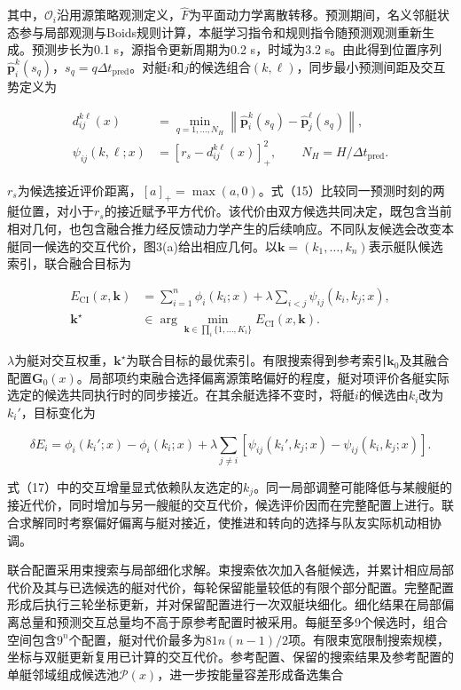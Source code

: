 \documentclass[UTF8,a4paper,zihao=5,fontset=none]{ctexart}
\begin{document}
其中，\(\mathcal O_i\)沿用源策略观测定义，\(\widehat F\)为平面动力学离散转移。预测期间，名义邻艇状态参与局部观测与Boids规则计算，本艇学习指令和规则指令随预测观测重新生成。预测步长为0.1 s，源指令更新周期为0.2 s，时域为3.2 s。由此得到位置序列\(\widehat{\boldsymbol p}_i^k(s_q)\)，\(s_q=q\Delta t_{\mathrm{pred}}\)。对艇\(i\)和\(j\)的候选组合\((k,\ell)\)，同步最小预测间距及交互势定义为

\[
\begin{aligned}
d_{ij}^{k\ell}(x)
&=\min_{q=1,\ldots,N_H}
\left\|\widehat{\boldsymbol p}_i^k(s_q)-\widehat{\boldsymbol p}_j^\ell(s_q)\right\|,\\
\psi_{ij}(k,\ell;x)&=\left[r_s-d_{ij}^{k\ell}(x)\right]_+^2,
\qquad N_H=H/\Delta t_{\mathrm{pred}}.
\end{aligned}
\tag{15}
\]

\(r_s\)为候选接近评价距离，\([a]_+=\max(a,0)\)。式（15）比较同一预测时刻的两艇位置，对小于\(r_s\)的接近赋予平方代价。该代价由双方候选共同决定，既包含当前相对几何，也包含融合推力经反馈动力学产生的后续响应。不同队友候选会改变本艇同一候选的交互代价，图3(a)给出相应几何。以\(\boldsymbol k=(k_1,\ldots,k_n)\)表示艇队候选索引，联合融合目标为

\[
\begin{aligned}
E_{\mathrm{CI}}(x,\boldsymbol k)
&=\sum_{i=1}^{n}\phi_i(k_i;x)
+\lambda\sum_{i<j}\psi_{ij}(k_i,k_j;x),\\
\boldsymbol k^\star&\in\arg\min_{\boldsymbol k\in\prod_i\{1,\ldots,K_i\}}
E_{\mathrm{CI}}(x,\boldsymbol k).
\end{aligned}
\tag{16}
\]

\(\lambda\)为艇对交互权重，\(\boldsymbol k^\star\)为联合目标的最优索引。有限搜索得到参考索引\(\boldsymbol k_0\)及其融合配置\(\boldsymbol G_0(x)\)。局部项约束融合选择偏离源策略偏好的程度，艇对项评价各艇实际选定的候选共同执行时的同步接近。在其余艇选择不变时，将艇\(i\)的候选由\(k_i\)改为\(k_i'\)，目标变化为

\[
\delta E_i=
\phi_i(k_i';x)-\phi_i(k_i;x)
+\lambda\sum_{j\ne i}
\left[\psi_{ij}(k_i',k_j;x)-\psi_{ij}(k_i,k_j;x)\right].
\tag{17}
\]

式（17）中的交互增量显式依赖队友选定的\(k_j\)。同一局部调整可能降低与某艘艇的接近代价，同时增加与另一艘艇的交互代价，候选评价因而在完整配置上进行。联合求解同时考察偏好偏离与艇对接近，使推进和转向的选择与队友实际机动相协调。

联合配置采用束搜索与局部细化求解。束搜索依次加入各艇候选，并累计相应局部代价及其与已选候选的艇对代价，每轮保留能量较低的有限个部分配置。完整配置形成后执行三轮坐标更新，并对保留配置进行一次双艇块细化。细化结果在局部偏离总量和预测交互总量均不高于原参考配置时被采用。每艇至多9个候选时，组合空间包含\(9^n\)个配置，艇对代价最多为\(81n(n-1)/2\)项。有限束宽限制搜索规模，坐标与双艇更新复用已计算的交互代价。参考配置、保留的搜索结果及参考配置的单艇邻域组成候选池\(\mathcal P(x)\)，进一步按能量容差形成备选集合
\end{document}

